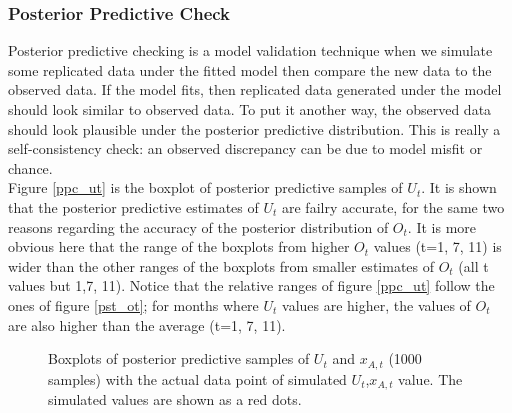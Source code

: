\documentclass[12pt]{article}
\begin{document}
{\newpage
\subsubsection{Posterior Predictive Check}
Posterior predictive checking is a model validation technique when we simulate some replicated data under the fitted model then compare the new data to the observed data. If the model fits, then replicated data generated under the model should look similar to observed data. To put it another way, the observed data should look plausible under the posterior predictive distribution. This is really a self-consistency check: an observed discrepancy can be due to model misfit or chance. \cite{bda_galman}\\

Figure \ref{ppc_ut} is the boxplot of posterior predictive samples of $U_t$. It is shown that the posterior predictive estimates of $U_t$ are failry accurate, for the same two reasons regarding the accuracy of the posterior distribution of $O_t$. It is more obvious here that the range of the boxplots from higher $O_t$ values (t=1, 7, 11) is wider than the other ranges of the boxplots from smaller estimates of $O_t$ (all t values but 1,7, 11). Notice that the relative ranges of figure \ref{ppc_ut} follow the ones of figure \ref{pst_ot}; for months where $U_t$ values are higher, the values of $O_t$ are also higher than the average (t=1, 7, 11).\\

\begin{figure}[htb]
	\centering
	\caption[Initial result: box plots of predictive posterior samples of $U_t$ and $x_{A,t}$]{Boxplots of posterior predictive samples of $U_t$ and $x_{A,t}$ (1000 samples) with the actual data point of simulated $U_t$,$x_{A,t}$ value. The simulated values are shown as a red dots.}
	

\end{figure}}
\end{document}
